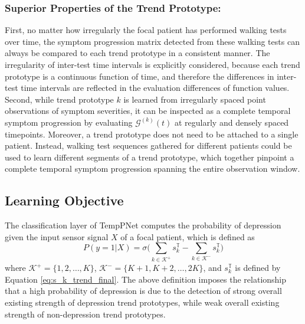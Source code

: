 \documentclass[mnsc]{informs3b} %
\begin{document}
\subsubsection{Superior Properties of the Trend Prototype:}\label{sec:method:proto_layer:summary} 
First, no matter how irregularly the focal patient has performed walking tests over time, the symptom progression matrix detected from these walking tests can always be compared to each trend prototype in a consistent manner. The irregularity of inter-test time intervals is explicitly considered, because each trend prototype is a continuous function of time, and therefore the differences in inter-test time intervals are reflected in the evaluation differences of function values.
Second, while trend prototype $k$ is learned from irregularly spaced point observations of symptom severities, it can be inspected as a complete temporal symptom progression by evaluating $\mathcal{G}^{(k)}(t)$ at regularly and densely spaced timepoints. Moreover, a trend prototype does not need to be attached to a single patient. Instead, walking test sequences gathered for different patients could be used to learn different segments of a trend prototype, which together pinpoint a complete temporal symptom progression spanning the entire observation window.


\subsection{Learning Objective} \label{sec:method:lr_obj}

The classification layer of TempPNet computes the probability of depression given the input sensor signal $X$ of a focal patient, which is defined as
\begin{equation}
\label{eq:class_layer}
    P(y=1|X) = \sigma \Big( \sum_{k \in \mathcal{K}^{+} } s_k^{\mathbb{T}} - \sum_{k \in \mathcal{K}^{-} } s_k^{\mathbb{T}} \Big)
\end{equation}
where $\mathcal{K}^{+}=\{1,2,\dots,K\}$, $\mathcal{K}^{-}=\{K+1,K+2,\dots,2K\}$, and $s_k^{\mathbb{T}}$ is defined by Equation \ref{eq:s_k_trend_final}. The above definition imposes the relationship that a high probability of depression is due to the detection of strong overall existing strength of depression trend prototypes, while weak overall existing strength of non-depression trend prototypes. 
\end{document}
